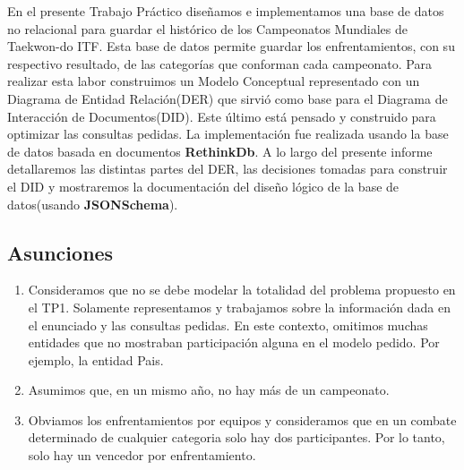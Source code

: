 En el presente Trabajo Práctico diseñamos e implementamos una base de datos no relacional para guardar el histórico de los
Campeonatos Mundiales de Taekwon-do ITF. Esta base de datos permite guardar los enfrentamientos, con su respectivo
resultado, de las categorías que conforman cada campeonato. Para realizar esta labor construimos un Modelo Conceptual representado con un
Diagrama de Entidad Relación(DER) que sirvió como base para el Diagrama de Interacción de Documentos(DID). Este último está
pensado y construido para optimizar las consultas pedidas. La implementación fue realizada usando la base de datos basada
en documentos \textbf{RethinkDb}. A lo largo del presente informe detallaremos las distintas partes del DER, las decisiones
tomadas para construir el DID y mostraremos la documentación del diseño lógico de la base de datos(usando \textbf{JSONSchema}).

\subsection{Asunciones}
\begin{enumerate}
\item Consideramos que no se debe modelar la totalidad del problema propuesto en el TP1. Solamente representamos y trabajamos
sobre la información dada en el enunciado y las consultas pedidas. En este contexto, omitimos muchas entidades que no mostraban
participación alguna en el modelo pedido. Por ejemplo, la entidad Pais.
\item Asumimos que, en un mismo año, no hay más de un campeonato.
\item Obviamos los enfrentamientos por equipos y consideramos que en un combate determinado de cualquier categoria solo hay
dos participantes. Por lo tanto, solo hay un vencedor por enfrentamiento.
\end{enumerate}
